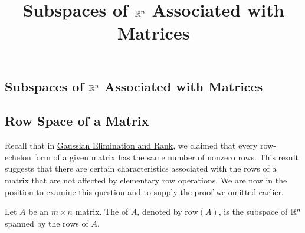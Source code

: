 \documentclass{ximera}
\title{Subspaces of $\mathbb{R}^n$ Associated with Matrices} \license{CC BY-NC-SA 4.0}
\begin{document}
\begin{abstract}

\end{abstract}
\maketitle

\begin{onlineOnly}
\section*{Subspaces of $\mathbb{R}^n$ Associated with Matrices}
\end{onlineOnly}


\subsection*{Row Space of a Matrix}
Recall that in \href{https://ximera.osu.edu/oerlinalg/LinearAlgebra/SYS-0030/main}{Gaussian Elimination and Rank}, we claimed that every row-echelon form of a given matrix has the same number of nonzero rows.  This result suggests that there are certain characteristics associated with the rows of a matrix that are not affected by elementary row operations.  We are now in the position to examine this question and to supply the proof we omitted earlier.
\begin{definition}\label{def:rowspace} Let $A$ be an $m\times n$ matrix.  The  of $A$, denoted by $\mbox{row}(A)$, is the subspace of $\mathbb{R}^n$ spanned by the rows of $A$.
\end{definition}
\end{document}
